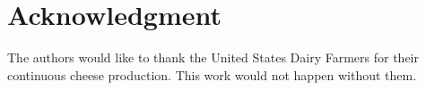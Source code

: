 \documentclass[journal,onecolumn]{IEEEtran}
\begin{document}
\justifying
\section*{Acknowledgment}


	{The authors would like to thank the United States Dairy Farmers for their continuous cheese production. This work would not happen without them.}


\ifCLASSOPTIONcaptionsoff
\newpage
\fi





%
%
%


	  
	 





\end{document}
